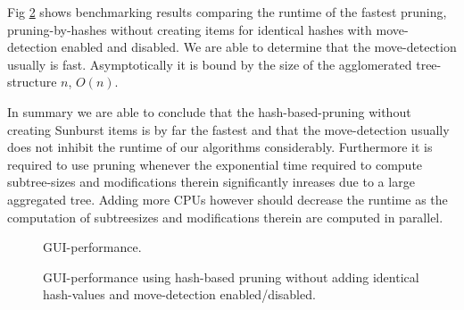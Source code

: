 Fig \ref{fig:gui-performance-movedet} shows benchmarking results comparing the runtime of the fastest pruning, pruning-by-hashes without creating items for identical hashes with move-detection enabled and disabled. We are able to determine that the move-detection usually is fast. Asymptotically it is bound by the size of the agglomerated tree-structure $n$, $O(n)$.

In summary we are able to conclude that the hash-based-pruning without creating Sunburst items is by far the fastest and that the move-detection usually does not inhibit the runtime of our algorithms considerably. Furthermore it is required to use pruning whenever the exponential time required to compute subtree-sizes and modifications therein significantly inreases due to a large aggregated tree. Adding more CPUs however should decrease the runtime as the computation of subtreesizes and modifications therein are computed in parallel.

\begin{figure}[tb]
\caption{\label{fig:gui-performance} GUI-performance.}
\end{figure}

\begin{figure}[tb]
\caption{\label{fig:gui-performance-movedet} GUI-performance using hash-based pruning without adding identical hash-values and move-detection enabled/disabled.}
\end{figure}

